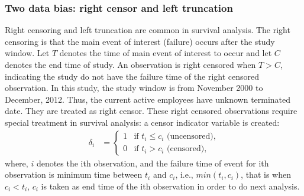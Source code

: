 \documentclass[12pt,letterpaper]{article}
\begin{document}
\subsubsection{Two data bias: right censor and left truncation}
 Right censoring and left truncation are common in survival analysis. The right censoring is that the main event of interest (failure) occurs after the study window. Let $T$ denotes the time of main event of interest to occur and let $C$ denotes the end time of study. An observation is right censored when $T> C$, indicating the study do not have the failure time of the right censored observation. In this study, the study window is from November 2000 to December, 2012. Thus, the current active employees have unknown terminated date. They are treated as right censor. These right censored observations require special treatment in survival analysis: a censor indicator variable is created: 
    \begin{align*}
    \delta_i&=
    \begin{cases}
    1   &\text{if  }  t_i \leq c_i \text{ (uncensored),}\\
    0   &\text{if  }  t_i > c_i \text{ (censored),}
    \end{cases}
    \end{align*}
    where, $i$ denotes the ith observation, and the failure time of event for ith observation is minimum time between $t_i$ and $c_i$, i.e., $min(t_i, c_i)$, that is when $ c_i <t_i $, $c_i$ is taken as end time of the ith observation in order to do next  analysis.
    
\end{document}
